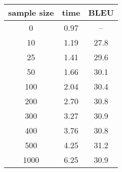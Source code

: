 \begin{tabular}{ccc}
	sample size & time & BLEU \\ \hline
	0 & 0.97 & -- \\
	10   & 1.19 & 27.8 \\
	25   & 1.41 & 29.6 \\
	50   & 1.66 & 30.1 \\
	100  & 2.04 & 30.4 \\
	200  & 2.70 & 30.8 \\
	300  & 3.27 & 30.9 \\
	400  & 3.76 & 30.8 \\
	500  & 4.25 & 31.2 \\
	1000 & 6.25 & 30.9 \\
\end{tabular}